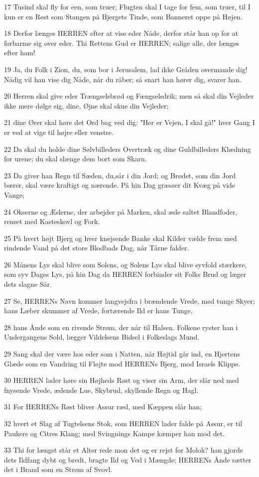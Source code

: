\par 17 Tusind skal fly for een, som truer; Flugten skal I tage for fem, som truer, til I kun er en Rest som Stangen på Bjergets Tinde, som Banneret oppe på Højen.
\par 18 Derfor længes HERREN efter at vise eder Nåde, derfor står han op for at forbarme sig over eder. Thi Rettens Gud er HERREN; salige alle, der længes efter ham!
\par 19 Ja, du Folk i Zion, du, som bor i Jerusalem, lad ikke Gråden overmande dig! Nådig vil han vise dig Nåde, når du råber; så snart han hører dig, svarer han.
\par 20 Herren skal give eder Trængselsbrød og Fængselsdrik; men så skal din Vejleder ikke mere dølge sig, dine, Øjne skal skue din Vejleder;
\par 21 dine Ører skal høre det Ord bag ved dig: "Her er Vejen, I skal gå!" hver Gang I er ved at vige til højre eller venstre.
\par 22 Da skal du holde dine Sølvbilleders Overtræk og dine Guldbilleders Klædning for urene; du skal slænge dem bort som Skarn.
\par 23 Da giver han Regn til Sæden, du,sår i din Jord; og Brødet, som din Jord bærer, skal være kraftigt og nærende. På hin Dag græsser dit Kvæg på vide Vange;
\par 24 Okserne og Æslerne, der arbejder på Marken, skal æde saltet Blandfoder, renset med Kasteskovl og Fork.
\par 25 På hvert højt Bjerg og hver knejsende Banke skal Kilder vælde frem med rindende Vand på det store Blodbads Dag, når Tårne falder.
\par 26 Månens Lys skal blive som Solens, og Solens Lys skal blive syvfold stærkere, som syv Dages Lys, på hin Dag da HERREN forbinder sit Folks Brud og læger dets slagne Sår.
\par 27 Se, HERRENs Navn kommer langvejsfra i brændende Vrede, med tunge Skyer; hans Læber skummer af Vrede, fortærende Ild er hans Tunge,
\par 28 hans Ånde som en rivende Strøm, der når til Halsen. Folkene ryster han i Undergangens Sold, lægger Vildelsens Bidsel i Folkeslags Mund.
\par 29 Sang skal der være hos eder som i Natten, når Højtid går ind, en Hjertens Glæde som en Vandring til Fløjte mod HERRENs Bjerg, mod Israels Klippe.
\par 30 HERREN lader høre sin Højheds Røst og viser sin Arm, der slår ned med fnysende Vrede, ædende Lue, Skybrud, skyllende Regn og Hagl.
\par 31 For HERRENs Røst bliver Assur ræd, med Kæppen slår han;
\par 32 hvert et Slag af Tugtelsens Stok, som HERREN lader falde på Assur, er til Paukers og Citres Klang; med Svingnings Kampe kæmper han mod det.
\par 33 Thi for længst står et Alter rede mon det og er rejst for Molok? han gjorde dets Ildfang dybt og bredt, bragte Ild og Ved i Mængde; HERRENs Ånde sætter det i Brand som en Strøm af Svovl.

